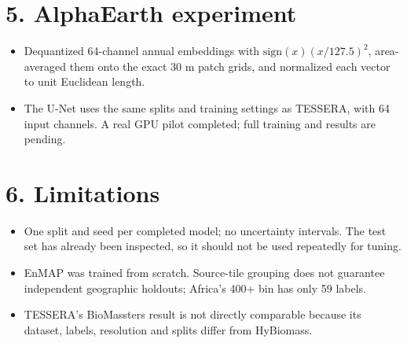 \documentclass[11pt]{article}
\begin{document}
\section*{5. AlphaEarth experiment}
\begin{itemize}
	\item Dequantized 64-channel annual embeddings with $\mathrm{sign}(x)(x/127.5)^2$, area-averaged them onto the exact 30 m patch grids, and normalized each vector to unit Euclidean length.
	\item The U-Net uses the same splits and training settings as TESSERA, with 64 input channels. A real GPU pilot completed; full training and results are pending.
\end{itemize}

\section*{6. Limitations}
\begin{itemize}
	\item One split and seed per completed model; no uncertainty intervals. The test set has already been inspected, so it should not be used repeatedly for tuning.
	\item EnMAP was trained from scratch. Source-tile grouping does not guarantee independent geographic holdouts; Africa's 400+ bin has only 59 labels.
	\item TESSERA's BioMassters result is not directly comparable because its dataset, labels, resolution and splits differ from HyBiomass.
\end{itemize}
\end{document}
